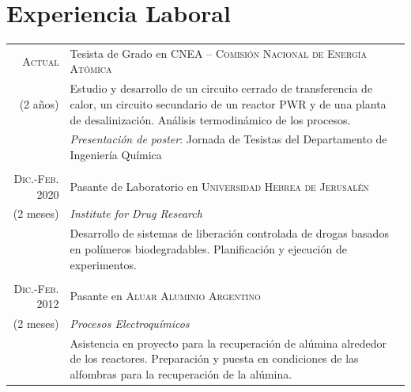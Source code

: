 \documentclass[a4paper,10pt]{article}
\begin{document}
\section{Experiencia Laboral}\smallskip
\begin{tabular}{r|p{11cm}}
\textsc{Actual}&Tesista de Grado en \textsc{CNEA -- Comisión Nacional de Energía Atómica}  \\(2 años)&\footnotesize{Estudio y desarrollo de un circuito cerrado de transferencia de calor, un circuito secundario de un reactor PWR y de una planta de desalinización. Análisis termodinámico de los procesos.}
 \\&\footnotesize{\emph{Presentación de poster}: Jornada de Tesistas del Departamento de Ingeniería Química}\\\multicolumn{2}{c}{} \\

\textsc{Dic.-Feb. 2020} & Pasante de Laboratorio en \textsc{Universidad Hebrea de Jerusalén}\\(2 meses) & \emph{Institute for Drug Research}\\&\footnotesize{Desarrollo de sistemas de liberación controlada de drogas basados en polímeros biodegradables. Planificación y ejecución de experimentos.}\\\multicolumn{2}{c}{}\\
 
\textsc{Dic.-Feb. 2012} & Pasante en \textsc{Aluar Aluminio Argentino}\\(2 meses)& \emph{Procesos Electroquímicos}\\&\footnotesize{Asistencia en proyecto para la recuperación de alúmina alrededor de los reactores. Preparación y puesta en condiciones de las alfombras para la recuperación de la alúmina.}
\end{tabular}\smallskip
\end{document}
